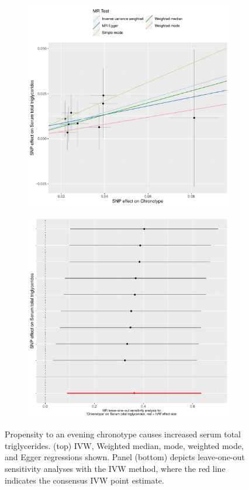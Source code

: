 \documentclass{article}
\begin{document}
\begin{figure}[htbp]
\begin{subfigure}{\linewidth}
\centering
	\includegraphics[width=.8\linewidth]{Figs/Analysis2/Chronotype_vs_Serum_total_triglycerides.Scatterplots.pdf}
\label{sttScatter}
\end{subfigure}
\begin{subfigure}{\linewidth}
\centering
	\includegraphics[width=.8\linewidth,keepaspectratio]{Figs/Analysis2/Chronotype_vs_Serum_total_triglycerides.LOOplots.pdf}
\label{sttLoo}
\end{subfigure}
\caption{Propensity to an evening chronotype causes increased serum total triglycerides. (top) IVW, Weighted median, mode, weighted mode, and Egger regressions shown. Panel (bottom) depicts leave-one-out sensitivity analyses with the IVW method, where the red line indicates the consensus IVW point estimate.}
\label{stt}
\end{figure}
\end{document}
